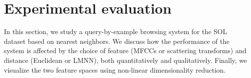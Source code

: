 \section{Experimental evaluation} \label{sec:exp}
In this section, we study a query-by-example browsing system for the SOL dataset based on nearest neighbors.
We discuss how the performance of the system is affected by the choice of feature (MFCCs or scattering transforms) and distance (Euclidean or LMNN), both quantitatively and qualitatively.
Finally, we visualize the two feature spaces using non-linear dimensionality reduction.






